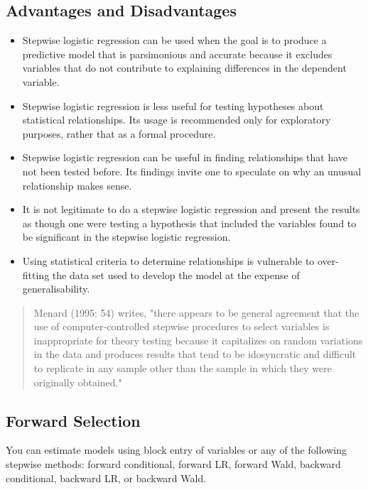 \documentclass[a4paper,12pt]{article}
\begin{document}
\subsection{Advantages and Disadvantages}
\begin{itemize}
	\item Stepwise logistic regression can be used when the goal is to produce a predictive model that is parsimonious and accurate because it excludes variables that do not contribute to explaining differences in the dependent variable.
	
	\item Stepwise logistic regression is less useful for testing hypotheses about statistical relationships. Its usage is recommended only for exploratory purposes, rather that as a formal procedure.
	
	\item Stepwise logistic regression can be useful in finding relationships that have not been tested before. Its findings invite one to speculate on why an unusual relationship makes sense.
	
	\item It is not legitimate to do a stepwise logistic regression and present the results as though one were testing a hypothesis that included the variables found to be significant in the stepwise logistic regression.
	
	\item Using statistical criteria to determine relationships is vulnerable to over-fitting the data set used to develop the model at the expense of generalisability.
	
\end{itemize}
\begin{quote}
	Menard (1995: 54) writes, "there appears to be general agreement that the use of computer-controlled stepwise procedures to select variables is inappropriate for theory testing because it capitalizes on random variations in the data and produces results that tend to be idosyncratic and difficult to replicate in any sample other than the sample in which they were originally obtained."
\end{quote}
\subsection{Forward Selection}
You can estimate models using block entry of variables or any of the following stepwise
methods: forward conditional, forward LR, forward Wald, backward conditional, backward
LR, or backward Wald.
\end{document}
